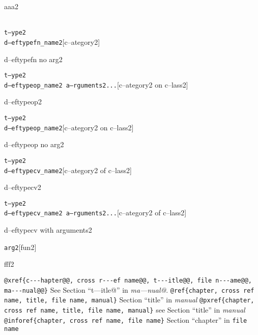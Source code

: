 \documentclass{book}
\begin{document}
\begin{titlepage}
%
aaa2

\noindent\texttt\bgroup{}\leavevmode{}\\t--ype2\leavevmode{}\\d--eftypefn\_name2\egroup{}\hfill[c--ategory2]



%
d--eftypefn no arg2

\noindent\texttt\bgroup{}t--ype2\leavevmode{}\\d--eftypeop\_name2 a--rguments2...\egroup{}\hfill[c--ategory2 on c--lass2]



%
d--eftypeop2

\noindent\texttt\bgroup{}t--ype2\leavevmode{}\\d--eftypeop\_name2\egroup{}\hfill[c--ategory2 on c--lass2]



%
d--eftypeop no arg2

\noindent\texttt\bgroup{}t--ype2\leavevmode{}\\d--eftypecv\_name2\egroup{}\hfill[c--ategory2 of c--lass2]



%
d--eftypecv2

\noindent\texttt\bgroup{}t--ype2\leavevmode{}\\d--eftypecv\_name2 a--rguments2...\egroup{}\hfill[c--ategory2 of c--lass2]



%
d--eftypecv with arguments2

\noindent\texttt\bgroup{}arg2\egroup{}\hfill[fun2]



%
fff2


\texttt{@xref\{c{-}{-}{-}hapter@@, cross r{-}{-}{-}ef name@@, t{-}{-}{-}itle@@, file n{-}{-}{-}ame@@, ma{-}{-}{-}nual@@\}} See Section ``t---itle@'' in \textit{ma---nual@}.
\texttt{@ref\{chapter, cross ref name, title, file name, manual\}} Section ``title'' in \textit{manual}
\texttt{@pxref\{chapter, cross ref name, title, file name, manual\}} see Section ``title'' in \textit{manual}
\texttt{@inforef\{chapter, cross ref name, file name\}} Section ``chapter'' in \texttt{file name}


\end{titlepage}
\end{document}
